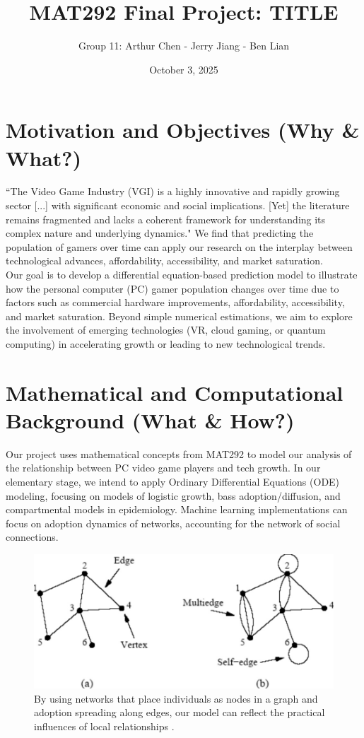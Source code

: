 \documentclass{article}
\title{\vspace{-2cm}MAT292 Final Project: TITLE}
\author{Group 11: Arthur Chen - Jerry Jiang - Ben Lian}
\date{October 3, 2025}
\begin{document}
\maketitle

\section{Motivation and Objectives (Why \& What?)}
``The Video Game Industry (VGI) is a highly innovative and rapidly growing sector [...] with significant economic and social implications. [Yet] the literature remains fragmented and lacks a coherent framework for understanding its complex nature and underlying dynamics." \cite{GOH2023100100} We find that predicting the population of gamers over time can apply our research on the interplay between technological advances, affordability, accessibility, and market saturation.\\

\noindent Our goal is to develop a differential equation-based prediction model to illustrate how the personal computer (PC) gamer population changes over time due to factors such as commercial hardware improvements, affordability, accessibility, and market saturation. Beyond simple numerical estimations, we aim to explore the involvement of emerging technologies (VR, cloud gaming, or quantum computing) in accelerating growth or leading to new technological trends.

\section{Mathematical and Computational Background (What \& How?)}
Our project uses mathematical concepts from MAT292 to model our analysis of the relationship between PC video game players and tech growth. In our elementary stage, we intend to apply Ordinary Differential Equations (ODE) modeling, focusing on models of logistic growth, bass adoption/diffusion, and compartmental models in epidemiology. Machine learning implementations can focus on adoption dynamics of networks, accounting for the network of social connections. 

\begin{figure} [H]
    \centering
    \includegraphics[width=0.5\linewidth]{Image.jpeg}
    \caption{By using networks that place individuals as nodes in a graph and adoption spreading along edges, our model can reflect the practical influences of local relationships \cite{10.1093/acprof:oso/9780199206650.003.0006}.}
    \label{fig:GraphNodeFigure}
\end{figure}
\end{document}
